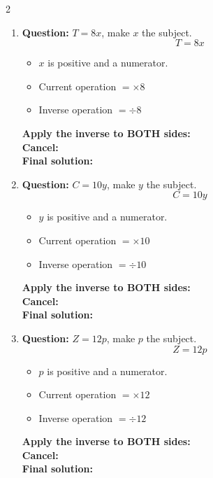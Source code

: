 \documentclass[11pt]{article}
\begin{document}
\begin{multicols}{2}
\begin{enumerate}[leftmargin=*, itemsep=10pt]
\item \textbf{Question:} \( T = 8x \), make \( x \) the subject.
\[
T=8x
\]
\begin{itemize}[leftmargin=*, itemsep=2pt]
\item \(x\) is positive and a numerator.
\item Current operation \(= \times 8\)
\item Inverse operation \(= \div 8\)
\end{itemize}
\textbf{Apply the inverse to BOTH sides:} \\[1.5cm]
\textbf{Cancel:} \\[1.5cm]
\textbf{Final solution:}\\[1.5cm]

\columnbreak
\item \textbf{Question:} \( C = 10y \), make \( y \) the subject.
\[
C=10y
\]
\begin{itemize}[leftmargin=*, itemsep=2pt]
\item \(y\) is positive and a numerator.
\item Current operation \(= \times 10\)
\item Inverse operation \(= \div 10\)
\end{itemize}
\textbf{Apply the inverse to BOTH sides:} \\[1.5cm]
\textbf{Cancel:} \\[1.5cm]
\textbf{Final solution:}\\[1.5cm]

\item \textbf{Question:} \( Z = 12p \), make \( p \) the subject.
\[
Z=12p
\]
\begin{itemize}[leftmargin=*, itemsep=2pt]
\item \(p\) is positive and a numerator.
\item Current operation \(= \times 12\)
\item Inverse operation \(= \div 12\)
\end{itemize}
\textbf{Apply the inverse to BOTH sides:} \\[1.5cm]
\textbf{Cancel:} \\[1.5cm]
\textbf{Final solution:}\\[1.5cm]


\end{enumerate}
\end{multicols}
\end{document}
